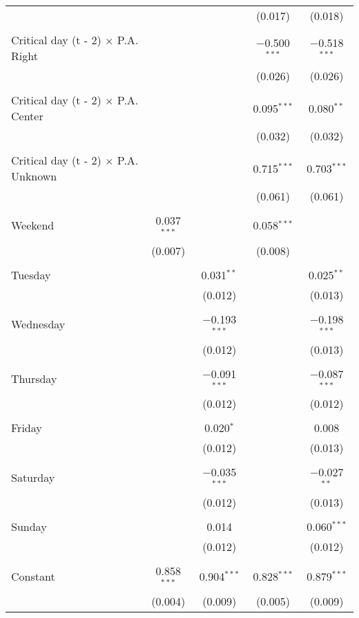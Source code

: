 \documentclass[
]{article}
\begin{document}
\begin{table}[!htbp]
{\begin{tabular}{@{\extracolsep{5pt}}lcccc}
  &  &  & (0.017) & (0.018) \\ 
  & & & & \\ 
 Critical day (t - 2) $\times$ P.A. Right &  &  & $-$0.500$^{***}$ & $-$0.518$^{***}$ \\ 
  &  &  & (0.026) & (0.026) \\ 
  & & & & \\ 
 Critical day (t - 2) $\times$ P.A. Center &  &  & 0.095$^{***}$ & 0.080$^{**}$ \\ 
  &  &  & (0.032) & (0.032) \\ 
  & & & & \\ 
 Critical day (t - 2) $\times$ P.A. Unknown &  &  & 0.715$^{***}$ & 0.703$^{***}$ \\ 
  &  &  & (0.061) & (0.061) \\ 
  & & & & \\ 
 Weekend & 0.037$^{***}$ &  & 0.058$^{***}$ &  \\ 
  & (0.007) &  & (0.008) &  \\ 
  & & & & \\ 
 Tuesday &  & 0.031$^{**}$ &  & 0.025$^{**}$ \\ 
  &  & (0.012) &  & (0.013) \\ 
  & & & & \\ 
 Wednesday &  & $-$0.193$^{***}$ &  & $-$0.198$^{***}$ \\ 
  &  & (0.012) &  & (0.013) \\ 
  & & & & \\ 
 Thursday &  & $-$0.091$^{***}$ &  & $-$0.087$^{***}$ \\ 
  &  & (0.012) &  & (0.012) \\ 
  & & & & \\ 
 Friday &  & 0.020$^{*}$ &  & 0.008 \\ 
  &  & (0.012) &  & (0.013) \\ 
  & & & & \\ 
 Saturday &  & $-$0.035$^{***}$ &  & $-$0.027$^{**}$ \\ 
  &  & (0.012) &  & (0.013) \\ 
  & & & & \\ 
 Sunday &  & 0.014 &  & 0.060$^{***}$ \\ 
  &  & (0.012) &  & (0.012) \\ 
  & & & & \\ 
 Constant & 0.858$^{***}$ & 0.904$^{***}$ & 0.828$^{***}$ & 0.879$^{***}$ \\ 
  & (0.004) & (0.009) & (0.005) & (0.009) \\ 

\end{tabular}}
\end{table}
\end{document}

